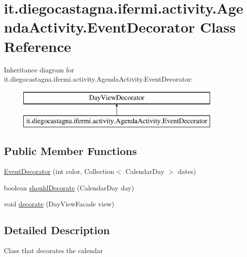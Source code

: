 \hypertarget{classit_1_1diegocastagna_1_1ifermi_1_1activity_1_1_agenda_activity_1_1_event_decorator}{}\section{it.\+diegocastagna.\+ifermi.\+activity.\+Agenda\+Activity.\+Event\+Decorator Class Reference}
\label{classit_1_1diegocastagna_1_1ifermi_1_1activity_1_1_agenda_activity_1_1_event_decorator}
Inheritance diagram for it.\+diegocastagna.\+ifermi.\+activity.\+Agenda\+Activity.\+Event\+Decorator\+:\begin{figure}[H]
\begin{center}
\leavevmode
\includegraphics[height=2.000000cm]{classit_1_1diegocastagna_1_1ifermi_1_1activity_1_1_agenda_activity_1_1_event_decorator}
\end{center}
\end{figure}
\subsection*{Public Member Functions}
\begin{DoxyCompactItemize}
\item 
\mbox{\hyperlink{classit_1_1diegocastagna_1_1ifermi_1_1activity_1_1_agenda_activity_1_1_event_decorator_aa3fa40898a3f95f8728771aeeba01865}{Event\+Decorator}} (int color, Collection$<$ Calendar\+Day $>$ dates)
\item 
boolean \mbox{\hyperlink{classit_1_1diegocastagna_1_1ifermi_1_1activity_1_1_agenda_activity_1_1_event_decorator_a3b425a172186086b5eb6858e22ec4081}{should\+Decorate}} (Calendar\+Day day)
\item 
void \mbox{\hyperlink{classit_1_1diegocastagna_1_1ifermi_1_1activity_1_1_agenda_activity_1_1_event_decorator_a19a2a449b46969b24f0dd1b52d73e1cf}{decorate}} (Day\+View\+Facade view)
\end{DoxyCompactItemize}


\subsection{Detailed Description}
Class that decorates the calendar 

